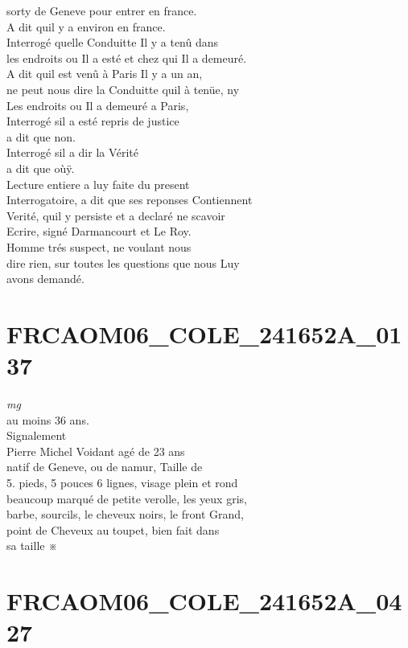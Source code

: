 \documentclass{article}
\begin{document}
\begin{pages}
sorty de Geneve pour entrer en france.\\
A dit quil y a environ en france.\\
Interrogé quelle Conduitte Il y a tenû dans\\
les endroits ou Il a esté et chez qui Il a demeuré.\\
A dit quil est venû à Paris Il y a un an,\\
ne peut nous dire la Conduitte quil à tenüe, ny\\
Les endroits ou Il a demeuré a Paris,\\
Interrogé sil a esté repris de justice\\
a dit que non.\\
Interrogé sil a dir la Vérité\\
a dit que oùÿ.\\
Lecture entiere a luy faite du present\\
Interrogatoire, a dit que ses reponses Contiennent\\
Verité, quil y persiste et a declaré ne scavoir\\
Ecrire, signé Darmancourt et Le Roy.\\
Homme trés suspect, ne voulant nous\\
dire rien, sur toutes les questions que nous Luy\\
avons demandé.
\pend
\endnumbering\beginnumbering\section{FRCAOM06\_COLE\_241652A\_0137}
\vspace{0.5cm}\noindent
\textit{mg}
\footnotesize \\
au moins 36 ans.
\normalsize \pstart
\\
Signalement\\
Pierre Michel Voidant agé de 23 ans\\
natif de Geneve, ou de namur, Taille de\\
5. pieds, 5 pouces 6 lignes, visage plein et rond\\
beaucoup marqué de petite verolle, les yeux gris,\\
barbe, sourcils, le cheveux noirs, le front Grand,\\
point de Cheveux au toupet, bien fait dans\\
sa taille ※
\pend
\endnumbering\beginnumbering\section{FRCAOM06\_COLE\_241652A\_0427}\pstart

\end{pages}
\end{document}
